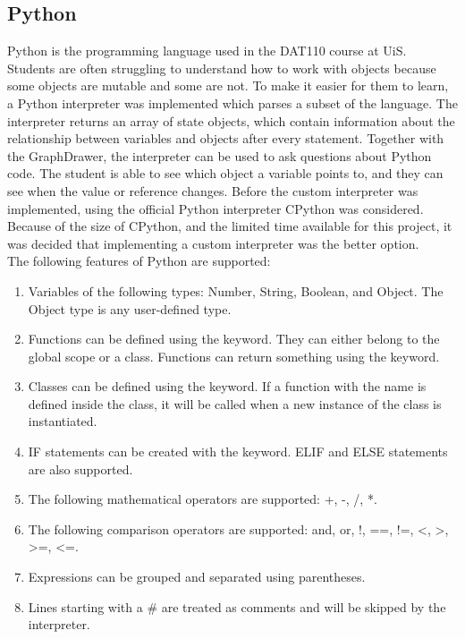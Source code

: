 \subsection{Python}
Python is the programming language used in the DAT110 course at UiS. Students are often struggling to understand how to work with objects because some objects are mutable and some are not. To make it easier for them to learn, a Python interpreter was implemented which parses a subset of the language. The interpreter returns an array of state objects, which contain information about the relationship between variables and objects after every statement. Together with the GraphDrawer, the interpreter can be used to ask questions about Python code. The student is able to see which object a variable points to, and they can see when the value or reference changes. Before the custom interpreter was implemented, using the official Python interpreter CPython \cite{CPython} was considered. Because of the size of CPython, and the limited time available for this project, it was decided that implementing a custom interpreter was the better option.
\\[11pt]
The following features of Python are supported:
\begin{enumerate}
    \item Variables of the following types: Number, String, Boolean, and Object. The Object type is any user-defined type.
    \item Functions can be defined using the  keyword. They can either belong to the global scope or a class. Functions can return something using the  keyword.
    \item Classes can be defined using the  keyword. If a function with the  name is defined inside the class, it will be called when a new instance of the class is instantiated.
    \item IF statements can be created with the  keyword. ELIF and ELSE statements are also supported.
    \item The following mathematical operators are supported: +, -, /, *.
    \item The following comparison operators are supported: and, or, !, ==, !=, <, >, >=, <=.
    \item Expressions can be grouped and separated using parentheses.
    \item Lines starting with a \# are treated as comments and will be skipped by the interpreter.
\end{enumerate}
